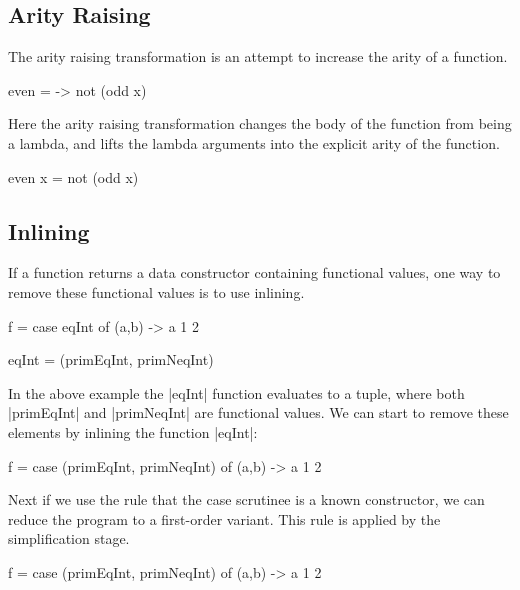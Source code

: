 \documentclass[preprint]{sigplanconf}
\begin{document}
\subsection{Arity Raising}

The arity raising transformation is an attempt to increase the arity of a function.

\begin{example}
\begin{code}
even = \x -> not (odd x)
\end{code}

Here the arity raising transformation changes the body of the function from being a lambda, and lifts the lambda arguments into the explicit arity of the function.

\begin{code}
even x = not (odd x)
\end{code}
\end{example}


\subsection{Inlining}

If a function returns a data constructor containing functional values, one way to remove these functional values is to use inlining.

\begin{example}
\begin{code}
f = case  eqInt of
          (a,b) -> a 1 2

eqInt = (primEqInt, primNeqInt)
\end{code}

In the above example the |eqInt| function evaluates to a tuple, where both |primEqInt| and |primNeqInt| are functional values. We can start to remove these elements by inlining the function |eqInt|:

\begin{code}
f = case  (primEqInt, primNeqInt) of
          (a,b) -> a 1 2
\end{code}

Next if we use the rule that the case scrutinee is a known constructor, we can reduce the program to a first-order variant. This rule is applied by the simplification stage.

\begin{code}
f = case  (primEqInt, primNeqInt) of
          (a,b) -> a 1 2
\end{code}
\end{example}
\end{document}
